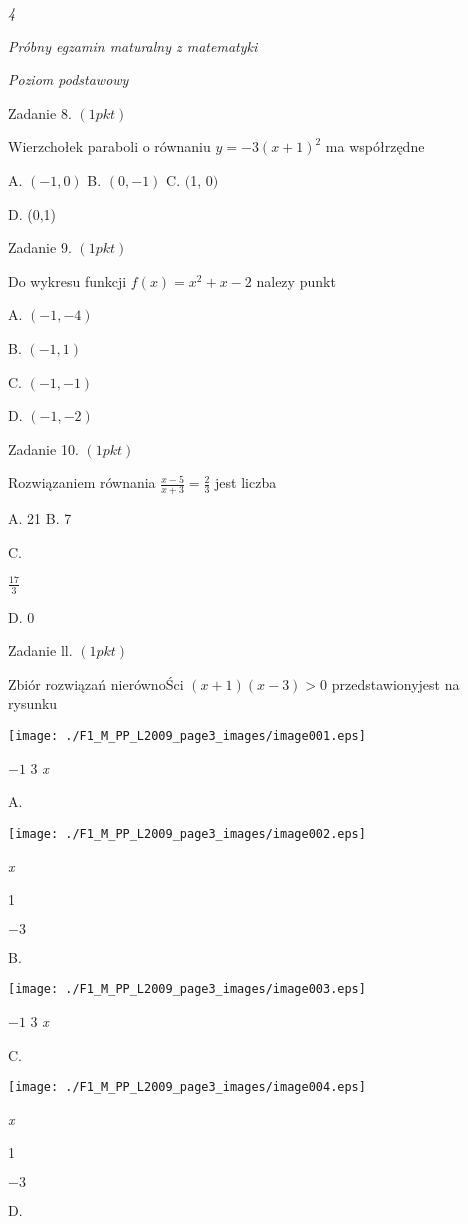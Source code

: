 \documentclass[a4paper,12pt]{article}
\begin{document}
{\it 4}

{\it Próbny egzamin maturalny z matematyki}

{\it Poziom podstawowy}

Zadanie 8. $(1pkt)$

Wierzchołek paraboli o równaniu $y=-3(x+1)^{2}$ ma współrzędne

A. $(-1,0)$ B. $(0,-1)$ C. $($1, $0)$

D. (0,1)

Zadanie 9. $(1pkt)$

Do wykresu funkcji $f(x)=x^{2}+x-2$ nalezy punkt

A. $(-1,-4)$

B. $(-1,1)$

C. $(-1,-1)$

D. $(-1,-2)$

Zadanie 10. $(1pkt)$

Rozwiązaniem równania $\displaystyle \frac{x-5}{x+3}=\frac{2}{3}$ jest liczba

A. 21 B. 7

C.

$\displaystyle \frac{17}{3}$

D. 0

Zadanie ll. $(1pkt)$

Zbiór rozwiązań nierównoŚci $(x+1)(x-3)>0$ przedstawionyjest na rysunku
\begin{center}
\texttt{[image: ./F1\_M\_PP\_L2009\_page3\_images/image001.eps]}
\end{center}
$-1$  3  {\it x}

A.
\begin{center}
\texttt{[image: ./F1\_M\_PP\_L2009\_page3\_images/image002.eps]}
\end{center}
{\it x}

1

$-3$

B.
\begin{center}
\texttt{[image: ./F1\_M\_PP\_L2009\_page3\_images/image003.eps]}
\end{center}
$-1$  3  {\it x}

C.
\begin{center}
\texttt{[image: ./F1\_M\_PP\_L2009\_page3\_images/image004.eps]}
\end{center}
{\it x}

1

$-3$

D.
\end{document}

